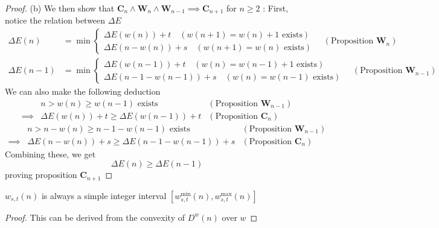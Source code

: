 \documentclass[]{article}
\begin{document}
\begin{proof}
\vspace{0.3cm}
(b) We then show that $\mathbf{C}_{n} \land \mathbf{W}_n \land \mathbf{W}_{n-1} \implies \mathbf{C}_{n+1}$ for $n\ge 2$ :
First, notice the relation between $\Delta E$
\begin{align*}
\Delta E(n)&= \min\begin{cases}
	\Delta E(w(n)) + t \quad(w(n+1) = w(n) + 1 \text{ exists})\\
	\Delta E(n-w(n)) + s\quad(w(n+1) = w(n) \text{ exists})
\end{cases} \quad (\text{Proposition $\mathbf{W}_n$}) \\
\Delta E(n-1)&= \min\begin{cases}
\Delta E(w(n-1)) + t \quad(w(n) = w(n-1) + 1\text{ exists})\\
\Delta E(n-1-w(n-1)) + s\quad(w(n) = w(n-1)\text{ exists})
\end{cases} \quad (\text{Proposition $\mathbf{W}_{n-1}$})
\end{align*}
We can also make the following deduction
\begin{align*}
	&n > w(n)\geq w(n-1)  \text{ exists}  &(\text{Proposition $\mathbf{W}_{n-1}$})\\
	\implies& \Delta E(w(n)) + t \geq  \Delta E(w(n-1)) + t &(\text{Proposition $\mathbf{C}_n$})
\end{align*}
\begin{align*}
&n>n-w(n)\geq n-1-w(n-1)  \text{ exists}  &(\text{Proposition $\mathbf{W}_{n-1}$})\\
\implies& \Delta E(n-w(n)) + s \geq \Delta E(n-1-w(n-1)) + s &(\text{Proposition $\mathbf{C}_n$})
\end{align*}
Combining these, we get
\[
\Delta E(n)\geq \Delta E(n-1)
\]
proving proposition $\mathbf{C}_{n+1}$

\end{proof}

\vspace{1cm}
\begin{lemma}[$w$-range]
	$w_{s,t}(n)$ is always a simple integer interval $[w_{s,t}^{\min}(n), w_{s,t}^{\max}(n)]$
\end{lemma}
\begin{proof}
	This can be derived from the convexity of $D^w(n)$ over $w$
\end{proof}
\end{document}
